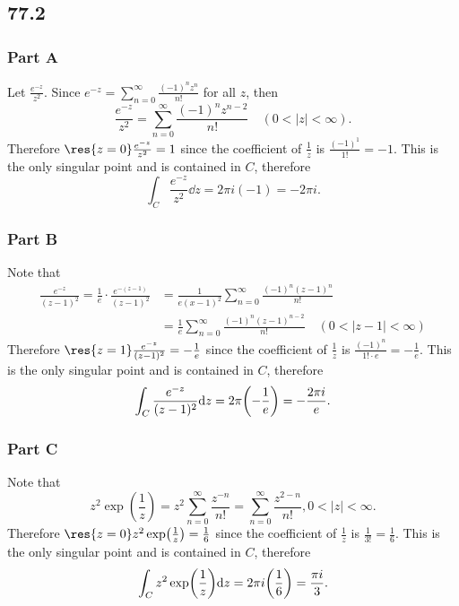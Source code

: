 \documentclass[12pt]{extarticle}
\begin{document}
\subsection*{77.2}
\begin{problem} \subsubsection*{Part A}
    Let $\frac{e^{-z}}{z^2}$. Since $e^{-z} = \sum_{n = 0}^\infty \frac{(-1)^n z^n}{n!}$ for all $z$, then
    \[
        \frac{e^{-z}}{z^2} = \sum_{n=0}^\infty \frac{(-1)^n z^{n-2}}{n!} \hspace{1em} (0 < |z| < \infty)
    .\]
    Therefore $\res{z = 0} \frac{e^{-z}}{z^2} = 1$ since the coefficient of $\frac{1}{z}$ is $\frac{(-1)^1}{1!} = -1$. This is the only singular point and is contained in $C$, therefore
    \[
        \int_C \frac{e^{-z}}{z^2} \dd z = 2 \pi i (-1) = - 2 \pi i
    .\]
\end{problem}

\begin{problem} \subsubsection*{Part B}
    Note that
    \begin{align*}
        \frac{e^{-z}}{(z-1)^2} = \frac{1}{e} \cdot \frac{e^{-(z-1)}}{(z-1)^2} &= \frac{1}{e(x-1)^2} \sum_{n=0}^\infty \frac{(-1)^n(z-1)^n}{n!} \\
        &= \frac{1}{e} \sum_{n=0}^\infty \frac{(-1)^n(z-1)^{n-2}}{n!} \hspace{1em} (0 < |z-1| < \infty)
    \end{align*}
    Therefore $\res{z = 1} \frac{e^{-z}}{(z-1)^2} = -\frac{1}{e}$ since the coefficient of $\frac{1}{z}$ is $\frac{(-1)^n}{1! \cdot e} = -\frac{1}{e}$. This is the only singular point and is contained in $C$, therefore
    \[
        \int_C \frac{e^{-z}}{(z-1)^2} \dd z = 2 \pi \qty(-\frac{1}{e}) = -\frac{2 \pi i}{e}
    .\]
\end{problem}

\begin{problem} \subsubsection*{Part C}
    Note that
    \[
        z^2 \exp(\frac{1}{z}) = z^2 \sum_{n=0}^\infty \frac{z^{-n}}{n!} = \sum_{n=0}^\infty \frac{z^{2-n}}{n!}, 0 < |z| < \infty
    .\]
    Therefore $\res{z=0} z^2 \exp(\frac{1}{z}) = \frac{1}{6}$ since the coefficient of $\frac{1}{z}$ is $\frac{1}{3!} = \frac{1}{6}$. This is the only singular point and is contained in $C$, therefore
    \[
        \int_C z^2 \exp(\frac{1}{z}) \dd z = 2 \pi i \qty(\frac{1}{6}) = \frac{\pi i}{3}
    .\]
\end{problem}
\end{document}
